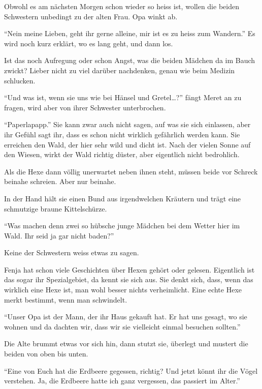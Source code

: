 \begin{center}
\end{center}

Obwohl es am nächsten Morgen schon wieder so heiss ist, wollen die beiden Schwestern unbedingt zu der alten Frau. Opa winkt ab.

\enquote{Nein meine Lieben, geht ihr gerne alleine, mir ist es zu heiss zum Wandern.} Es wird noch kurz erklärt, wo es lang geht, und dann los.

Ist das noch Aufregung oder schon Angst, was die beiden Mädchen da im Bauch
zwickt? Lieber nicht zu viel darüber nachdenken, genau wie beim Medizin schlucken. 

\enquote{Und was ist, wenn sie uns wie bei Hänsel und Gretel\dots?} fängt Meret an zu fragen, wird aber von ihrer Schwester unterbrochen.

\enquote{Paperlapapp.} Sie kann zwar auch nicht sagen, auf was sie sich einlassen, aber ihr Gefühl sagt ihr, dass es schon nicht wirklich gefährlich werden kann. Sie erreichen den Wald, der hier sehr wild und dicht ist. Nach der vielen Sonne auf den Wiesen, wirkt der Wald richtig düster, aber eigentlich nicht bedrohlich.

Als die Hexe dann völlig unerwartet neben ihnen steht, müssen beide vor Schreck beinahe schreien. Aber nur beinahe. 

In der Hand hält sie einen Bund aus irgendwelchen Kräutern und trägt eine schmutzige braune Kittelschürze.

\enquote{Was machen denn zwei so hübsche junge Mädchen bei dem Wetter hier im Wald. Ihr seid ja gar nicht baden?}

Keine der Schwestern weiss etwas zu sagen.

Fenja hat schon viele Geschichten über Hexen gehört oder gelesen. Eigentlich
ist das sogar ihr Spezialgebiet, da kennt sie sich aus. Sie denkt sich, dass, wenn das wirklich eine Hexe ist, man wohl besser nichts verheimlicht. Eine echte Hexe merkt bestimmt, wenn man schwindelt.

\enquote{Unser Opa ist der Mann, der ihr Haus gekauft hat. Er hat uns gesagt, wo sie wohnen und da dachten wir, dass wir sie vielleicht einmal besuchen sollten.}

Die Alte brummt etwas vor sich hin, dann stutzt sie, überlegt und mustert die beiden von oben bis unten.

\enquote{Eine von Euch hat die Erdbeere gegessen, richtig? Und jetzt könnt ihr die Vögel verstehen. Ja, die Erdbeere hatte ich ganz vergessen, das passiert im Alter.}

